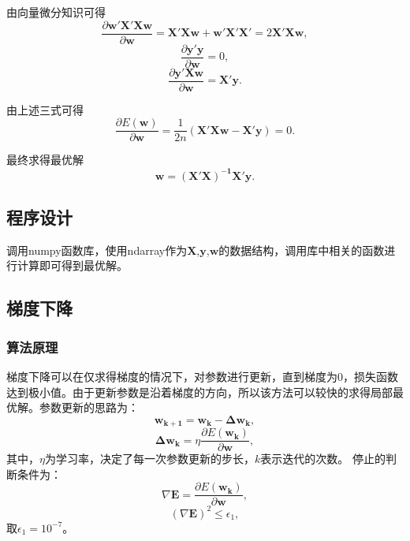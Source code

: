\documentclass[withoutpreface,bwprint]{cumcmthesis}
\begin{document}
由向量微分知识可得
\begin{equation*}
\frac{\partial{\boldsymbol{{w}'{X}'Xw}}}{\partial{\boldsymbol{w}}}=
\boldsymbol{{X}'Xw}+\boldsymbol{{{{w}'{X}'X}}'}=2\boldsymbol{{X}'Xw},
\end{equation*}
\begin{equation*}
\frac{\partial{\boldsymbol{{y}'y}}}{\partial{\boldsymbol{w}}}=0,
\end{equation*}
\begin{equation*}
\frac{\partial{\boldsymbol{{y}'Xw}}}{\partial{\boldsymbol{w}}}=\boldsymbol{{X}'y}.
\end{equation*}

由上述三式可得
\begin{equation}
\label{partial equation}
\frac{\partial{E\left(\boldsymbol{w}\right)}}{\partial{\boldsymbol{w}}}=
\frac{1}{2n}\left(\boldsymbol{{X}'Xw}-\boldsymbol{{X}'y}\right)=0.
\end{equation}

最终求得最优解
\begin{equation*}
\boldsymbol{w}=\boldsymbol{{\left({X}'X\right)}^{-1}{X}'y}.
\end{equation*}

\subsection{程序设计}
调用numpy函数库，使用ndarray作为$\boldsymbol{X}$,$\boldsymbol{y}$,$\boldsymbol{w}$的数据结构，调用库中相关的函数进行计算即可得到最优解。

\subsection{梯度下降}
\subsubsection{算法原理}
梯度下降可以在仅求得梯度的情况下，对参数进行更新，直到梯度为0，损失函数达到极小值。由于更新参数是沿着梯度的方向，所以该方法可以较快的求得局部最优解。参数更新的思路为：
\begin{equation*}
\boldsymbol{w_{k+1}}=\boldsymbol{w_{k}-\Delta w_{k}},
\end{equation*}
\begin{equation*}
\boldsymbol{\Delta w_{k}}=\eta \frac{\partial{E\left(\boldsymbol{w_{k}}\right)}}{\partial{\boldsymbol{w}}},
\end{equation*}
其中，$\eta$为学习率，决定了每一次参数更新的步长，$k$表示迭代的次数。
停止的判断条件为：
\begin{equation*}
\nabla\boldsymbol{E}=\frac{\partial{E\left(\boldsymbol{w_{k}}\right)}}{\partial{\boldsymbol{w}}},
\end{equation*}
\begin{equation*}
\left(\nabla\boldsymbol{E}\right)^{2}\leq \epsilon_{1},
\end{equation*}
取$\epsilon_{1}=10^{-7}$。
\end{document}
